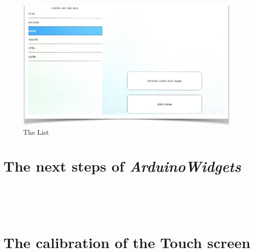 \documentclass[a4paper,11pt]{extarticle}
\begin{document}
\begin{figure}[htbp]
   \centering
   \includegraphics[scale=0.55]{AWFig22.png} 
   \caption{The List}
   \label{fig:22 }
\end{figure}


\newpage
\section{The next steps of \emph{ArduinoWidgets}}

~\\

~\\

~\\


\newpage
\section{The calibration of the Touch screen} 

~\\

~\\

~\\


\end{document}
